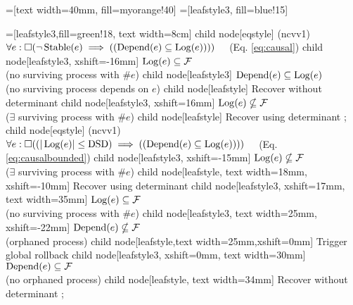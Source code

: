 

=[text width=40mm, fill=myorange!40]
=[leafstyle3, fill=blue!15]

=[leafstyle3,fill=green!18, text width=8cm]
%
%
        child {node[eqstyle] (ncvv1) {$\forall e: \square ( \neg \operatorname{Stable}(e) \implies ((\operatorname{Depend}(e) \subseteq \operatorname{Log}(e) )))$ ~~(Eq. \ref{eq:causal})}
	        child {node[leafstyle3, xshift=-16mm] {$\operatorname{Log}(e) \subseteq \mathcal{F}$ \\ (no surviving process with \#$e$)}
	        			child { node[leafstyle3] {$\operatorname{Depend}(e) \subseteq \operatorname{Log}(e)$ \\ (no surviving process depends on $e$)}
	        				child { node[leafstyle] {Recover without determinant}
	        				}
	        			}		
		        }
	        child {node[leafstyle3, xshift=16mm] {$\operatorname{Log}(e) \nsubseteq \mathcal{F}$ \\ ($\exists$ surviving process with \#$e$)}
		        		child { node[leafstyle] {Recover using determinant}
		        		}
	        }
};
%
%
        child {node[eqstyle] (ncvv1) {$\forall e: \square ( (|\operatorname{Log}(e)| \leq \text{DSD})  \implies 
   ((\operatorname{Depend}(e) \subseteq \operatorname{Log}(e) )))$ ~~(Eq. \ref{eq:causalbounded})}
	        child {node[leafstyle3, xshift=-15mm] {$\operatorname{Log}(e) \nsubseteq \mathcal{F}$ \\ ($\exists$ surviving process with \#$e$)}
		        		child { node[leafstyle, text width=18mm, xshift=-10mm] {Recover using determinant}
		        		}
	        }
        child {node[leafstyle3, xshift=17mm, text width=35mm] {$\operatorname{Log}(e) \subseteq \mathcal{F}$ \\ (no surviving process with \#$e$)}
        	child { node[leafstyle3, text width=25mm, xshift=-22mm] {$\operatorname{Depend}(e) \nsubseteq \mathcal{F}$ \\(orphaned process)}
	        		child { node[leafstyle,text width=25mm,xshift=0mm] {Trigger global rollback}
	        		}
	        }
        	child { node[leafstyle3, xshift=0mm, text width=30mm] {$\operatorname{Depend}(e) \subseteq \mathcal{F}$ \\ (no orphaned process)}
	        		child { node[leafstyle, text width=34mm] {Recover without determinant}
	        		}
	        }	
        }
};

